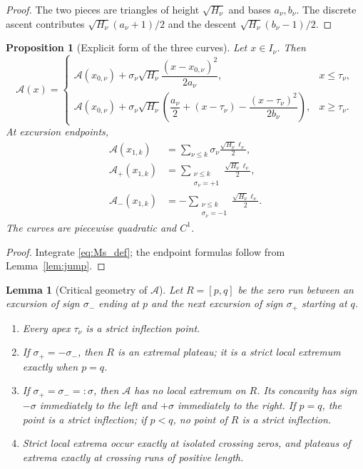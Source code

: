 \documentclass[11pt]{amsart}
\numberwithin{equation}{section}
\theoremstyle{plain}
\newtheorem{proposition}[theorem]{Proposition}
\newtheorem{lemma}[theorem]{Lemma}
\theoremstyle{definition}
\theoremstyle{remark}
\newcommand{\Ap}{\mathcal{A}_{+}}
\newcommand{\Am}{\mathcal{A}_{-}}
\newcommand{\Anet}{\mathcal{A}}
\begin{document}
\begin{proof}
The two pieces are triangles of height $\sqrt{H_\nu}$ and bases $a_\nu,b_\nu$.
The discrete ascent contributes $\sqrt{H_\nu}(a_\nu+1)/2$ and the descent
$\sqrt{H_\nu}(b_\nu-1)/2$.
\end{proof}

\begin{proposition}[Explicit form of the three curves]
\label{prop:explicit}
Let $x\in I_\nu$. Then
\begin{equation}
\label{eq:explicit_A}
\Anet(x)=
\begin{cases}
\Anet(x_{0,\nu})+\sigma_\nu\sqrt{H_\nu}
\dfrac{(x-x_{0,\nu})^2}{2a_\nu},&x\le\tau_\nu,\\[2ex]
\Anet(x_{0,\nu})+\sigma_\nu\sqrt{H_\nu}
\left(\dfrac{a_\nu}{2}+(x-\tau_\nu)-
\dfrac{(x-\tau_\nu)^2}{2b_\nu}\right),&x\ge\tau_\nu.
\end{cases}
\end{equation}
At excursion endpoints,
\begin{align}
\Anet(x_{1,k})&=\sum_{\nu\le k}\sigma_\nu\frac{\sqrt{H_\nu}\ell_\nu}{2},\label{eq:explicit_net}\\
\Ap(x_{1,k})&=\sum_{\substack{\nu\le k\\\sigma_\nu=+1}}
\frac{\sqrt{H_\nu}\ell_\nu}{2},\label{eq:explicit_plus}\\
\Am(x_{1,k})&=-\sum_{\substack{\nu\le k\\\sigma_\nu=-1}}
\frac{\sqrt{H_\nu}\ell_\nu}{2}.\label{eq:explicit_minus}
\end{align}
The curves are piecewise quadratic and $C^1$.
\end{proposition}

\begin{proof}
Integrate \eqref{eq:Ms_def}; the endpoint formulas follow from
Lemma~\ref{lem:jump}.
\end{proof}

\begin{lemma}[Critical geometry of $\Anet$]
\label{lem:critical}
Let $R=[p,q]$ be the zero run between an excursion of sign $\sigma_-$ ending
at $p$ and the next excursion of sign $\sigma_+$ starting at $q$.
\begin{enumerate}[label=\textup{(\roman*)}]
\item Every apex $\tau_\nu$ is a strict inflection point.
\item If $\sigma_+=-\sigma_-$, then $R$ is an extremal plateau; it is a
strict local extremum exactly when $p=q$.
\item If $\sigma_+=\sigma_-=:\sigma$, then $\Anet$ has no local extremum on
$R$.  Its concavity has sign $-\sigma$ immediately to the left and
$+\sigma$ immediately to the right.  If $p=q$, the point is a strict
inflection; if $p<q$, no point of $R$ is a strict inflection.
\item Strict local extrema occur exactly at isolated crossing zeros, and
plateaus of extrema exactly at crossing runs of positive length.
\end{enumerate}
\end{lemma}
\end{document}
